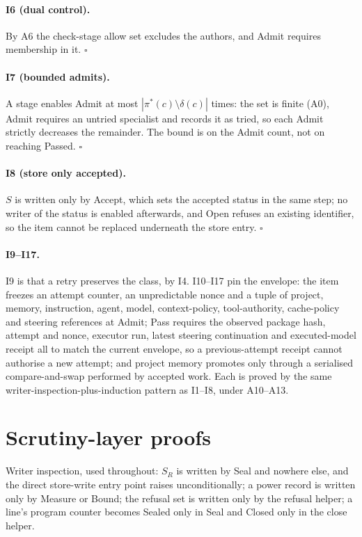 \documentclass[11pt,a4paper]{article}
\theoremstyle{plain}
\theoremstyle{definition}
\theoremstyle{remark}
\newcommand{\SR}{\ensuremath{S_R}}
\begin{document}
\paragraph{I6 (dual control).} By A6 the check-stage allow set excludes the authors, and Admit requires membership in it. $\square$

\paragraph{I7 (bounded admits).} A stage enables Admit at most $|\pi^{*}(c)\setminus\delta(c)|$ times: the set is finite (A0), Admit requires an untried specialist and records it as tried, so each Admit strictly decreases the remainder. The bound is on the Admit count, not on reaching Passed. $\square$

\paragraph{I8 (store only accepted).} $S$ is written only by Accept, which sets the accepted status in the same step; no writer of the status is enabled afterwards, and Open refuses an existing identifier, so the item cannot be replaced underneath the store entry. $\square$

\paragraph{I9--I17.} I9 is that a retry preserves the class, by I4. I10--I17 pin the envelope: the item freezes an attempt counter, an unpredictable nonce and a tuple of project, memory, instruction, agent, model, context-policy, tool-authority, cache-policy and steering references at Admit; Pass requires the observed package hash, attempt and nonce, executor run, latest steering continuation and executed-model receipt all to match the current envelope, so a previous-attempt receipt cannot authorise a new attempt; and project memory promotes only through a serialised compare-and-swap performed by accepted work. Each is proved by the same writer-inspection-plus-induction pattern as I1--I8, under A10--A13.

\section{Scrutiny-layer proofs}
\label{app:scrutiny}

Writer inspection, used throughout: $\SR$ is written by Seal and nowhere else, and the direct store-write entry point raises unconditionally; a power record is written only by Measure or Bound; the refusal set is written only by the refusal helper; a line's program counter becomes Sealed only in Seal and Closed only in the close helper.
\end{document}
